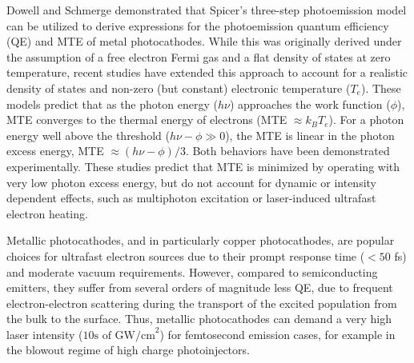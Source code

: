 

Dowell and Schmerge demonstrated that Spicer's three-step photoemission model\cite{spicer} can be utilized to derive expressions for the photoemission quantum efficiency (QE) and MTE of metal photocathodes.\cite{dowell2009_QuantumEfficiencyThermal} While this was originally derived under the assumption of a free electron Fermi gas and a flat density of states at zero temperature,  recent studies have extended this approach to account for a realistic density of states and non-zero (but constant) electronic temperature ($T_e$). \cite{Dimitrov2017,Feng2015} These models predict that as the photon energy ($h\nu$) approaches the work function ($\phi$), MTE converges to the thermal energy of electrons (MTE $\approx k_B T_e$). For a photon energy well above the threshold ($h\nu - \phi \gg 0$), the MTE is linear in the photon excess energy, MTE $ \approx (h\nu-\phi)/3$. Both behaviors have been demonstrated experimentally.\cite{Feng2015}  These studies predict that MTE is minimized by operating with very low photon excess energy, but do not account for dynamic or intensity dependent effects, such as multiphoton excitation or laser-induced ultrafast electron heating.


Metallic photocathodes, and in particularly copper photocathodes, are popular choices for ultrafast electron sources due to their prompt response time ($<50$ fs) and moderate vacuum requirements.\cite{ttm,plasmon} However, compared to semiconducting emitters, they suffer from several orders of magnitude less QE, due to frequent electron-electron scattering  during the transport of the excited population from the bulk to the surface. Thus, metallic photocathodes can demand a very high laser intensity   ($\textrm{10s of GW/cm}^2$) for femtosecond emission cases, for example in the blowout regime\cite{blowout} of high charge photoinjectors.

